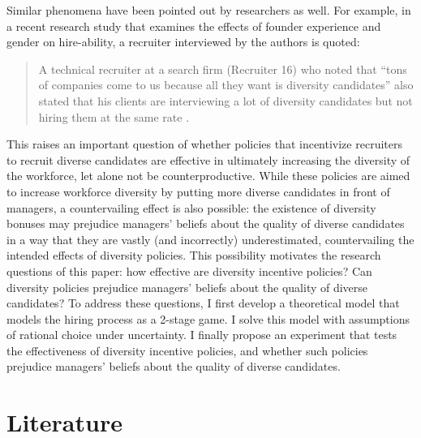 \documentclass[11pt]{article}
\begin{document}
Similar phenomena have been pointed out by researchers as well. For example, in a recent research study that examines the effects of founder experience and gender on hire-ability, a recruiter interviewed by the authors is quoted:

\begin{quote}
    A technical recruiter at a search firm (Recruiter 16) who noted that “tons of companies come to us because all they want is diversity candidates” also stated that his clients are interviewing a lot of diversity candidates but not hiring them at the same rate \parencite{botelho_founder_2019}.

\end{quote}

This raises an important question of whether policies that incentivize recruiters to recruit diverse candidates are effective in ultimately increasing the diversity of the workforce, let alone not be counterproductive. While these policies are aimed to increase workforce diversity by putting more diverse candidates in front of managers, a countervailing effect is also possible: the existence of diversity bonuses may prejudice managers' beliefs about the quality of diverse candidates in a way that they are vastly (and incorrectly) underestimated, countervailing the intended effects of diversity policies. This possibility motivates the research questions of this paper: how effective are diversity incentive policies? Can diversity policies prejudice managers' beliefs about the quality of diverse candidates? To address these questions, I first develop a theoretical model that models the hiring process as a 2-stage game. I solve this model with assumptions of rational choice under uncertainty. I finally propose an experiment that tests the effectiveness of diversity incentive policies, and whether such policies prejudice managers' beliefs about the quality of diverse candidates.

\section{Literature}
\end{document}
